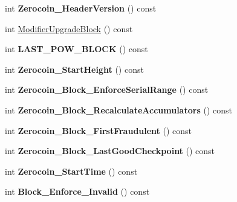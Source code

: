 \begin{DoxyCompactItemize}
\mbox{\label{class_c_chain_params_afcf5e1e63110dc8242be2b631ead6f1e}} 
int {\bfseries Zerocoin\+\_\+\+Header\+Version} () const
\item 
int \mbox{\hyperlink{class_c_chain_params_ad166dbdd9631958fa0126e13dec1630a}{Modifier\+Upgrade\+Block}} () const
\item 
\mbox{\label{class_c_chain_params_a836847832c07d43f71d371aed259fb80}} 
int {\bfseries L\+A\+S\+T\+\_\+\+P\+O\+W\+\_\+\+B\+L\+O\+CK} () const
\item 
\mbox{\label{class_c_chain_params_a5c3b62573db5b5a6cdaee67d608353e0}} 
int {\bfseries Zerocoin\+\_\+\+Start\+Height} () const
\item 
\mbox{\label{class_c_chain_params_aed556aae7f3b194eb3d1699daa7d6b35}} 
int {\bfseries Zerocoin\+\_\+\+Block\+\_\+\+Enforce\+Serial\+Range} () const
\item 
\mbox{\label{class_c_chain_params_a4dcfed7f6d901fb89a5b77376e9d19f2}} 
int {\bfseries Zerocoin\+\_\+\+Block\+\_\+\+Recalculate\+Accumulators} () const
\item 
\mbox{\label{class_c_chain_params_a92c49924432a4786282ccfe32ecadf8a}} 
int {\bfseries Zerocoin\+\_\+\+Block\+\_\+\+First\+Fraudulent} () const
\item 
\mbox{\label{class_c_chain_params_a7d9e9fc154ad9bfc22f149a2a8903a9f}} 
int {\bfseries Zerocoin\+\_\+\+Block\+\_\+\+Last\+Good\+Checkpoint} () const
\item 
\mbox{\label{class_c_chain_params_ae921b3c9f58708e4a694bb0b1e42173a}} 
int {\bfseries Zerocoin\+\_\+\+Start\+Time} () const
\item 
\mbox{\label{class_c_chain_params_a273dbde532ea4c5cf57eea2150d1bea3}} 
int {\bfseries Block\+\_\+\+Enforce\+\_\+\+Invalid} () const
\end{DoxyCompactItemize}
